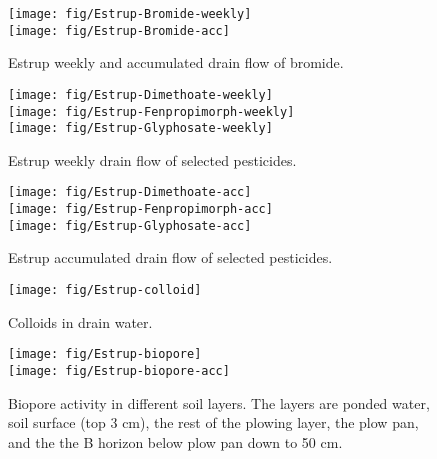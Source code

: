 \begin{figure}[htbp]
  \begin{center}
    \texttt{[image: fig/Estrup-Bromide-weekly]}\\
    \texttt{[image: fig/Estrup-Bromide-acc]}
  \end{center}
  \caption{Estrup weekly and accumulated drain flow of bromide.}
  \label{fig:Estrup-bromide-weekly}
\end{figure}\FloatBarrier


\begin{figure}[htbp]
  \begin{center}
    \texttt{[image: fig/Estrup-Dimethoate-weekly]}\\
    \texttt{[image: fig/Estrup-Fenpropimorph-weekly]}\\
    \texttt{[image: fig/Estrup-Glyphosate-weekly]}\\
  \end{center}
  \caption{Estrup weekly drain flow of selected pesticides.}
  \label{fig:Estrup-weekly}
\end{figure}\FloatBarrier

\begin{figure}[htbp]
  \begin{center}
    \texttt{[image: fig/Estrup-Dimethoate-acc]}\\
    \texttt{[image: fig/Estrup-Fenpropimorph-acc]}\\
    \texttt{[image: fig/Estrup-Glyphosate-acc]}\\
  \end{center}
  \caption{Estrup accumulated drain flow of selected pesticides.}
  \label{fig:Estrup-acc}
\end{figure}\FloatBarrier

\begin{figure}[htbp]
  \begin{center}
    \texttt{[image: fig/Estrup-colloid]}
  \end{center}
  \caption{Colloids in drain water.}
  \label{fig:Estrup-colloids}
\end{figure}\FloatBarrier

\begin{figure}[htbp]
  \begin{center}
    \texttt{[image: fig/Estrup-biopore]}\\
    \texttt{[image: fig/Estrup-biopore-acc]}\\
  \end{center}
  \caption{Biopore activity in different soil layers.  The layers are
    ponded water, soil surface (top 3 cm), the rest of the plowing layer,
    the plow pan, and the the B horizon below plow pan down to 50 cm.}
  \label{fig:Estrup-biopore}
\end{figure}\FloatBarrier

